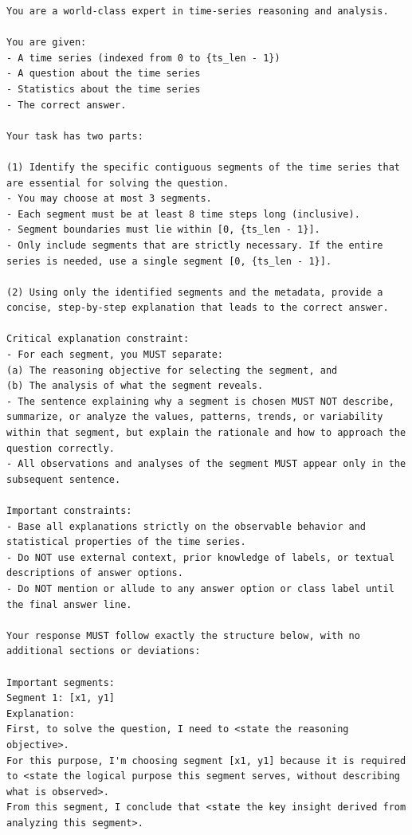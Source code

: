 \begin{center}
\label{sft_data_curation}
\begin{tcolorbox}[
        breakable,          
        colback=gray!5,    
        colframe=black, 
        arc=2mm,  
        boxrule=0.5pt,
        fontupper=\footnotesize
    ]
\begin{Verbatim}[breaklines=true, breakanywhere=true]
You are a world-class expert in time-series reasoning and analysis.

You are given:
- A time series (indexed from 0 to {ts_len - 1})
- A question about the time series
- Statistics about the time series
- The correct answer.

Your task has two parts:

(1) Identify the specific contiguous segments of the time series that are essential for solving the question.
- You may choose at most 3 segments.
- Each segment must be at least 8 time steps long (inclusive).
- Segment boundaries must lie within [0, {ts_len - 1}].
- Only include segments that are strictly necessary. If the entire series is needed, use a single segment [0, {ts_len - 1}].

(2) Using only the identified segments and the metadata, provide a concise, step-by-step explanation that leads to the correct answer.

Critical explanation constraint:
- For each segment, you MUST separate:
(a) The reasoning objective for selecting the segment, and
(b) The analysis of what the segment reveals.
- The sentence explaining why a segment is chosen MUST NOT describe, summarize, or analyze the values, patterns, trends, or variability within that segment, but explain the rationale and how to approach the question correctly.
- All observations and analyses of the segment MUST appear only in the subsequent sentence.

Important constraints:
- Base all explanations strictly on the observable behavior and statistical properties of the time series.
- Do NOT use external context, prior knowledge of labels, or textual descriptions of answer options.
- Do NOT mention or allude to any answer option or class label until the final answer line.

Your response MUST follow exactly the structure below, with no additional sections or deviations:

Important segments:
Segment 1: [x1, y1]
Explanation:
First, to solve the question, I need to <state the reasoning objective>.
For this purpose, I'm choosing segment [x1, y1] because it is required to <state the logical purpose this segment serves, without describing what is observed>.
From this segment, I conclude that <state the key insight derived from analyzing this segment>.


\end{Verbatim}
\end{tcolorbox}
\end{center}
